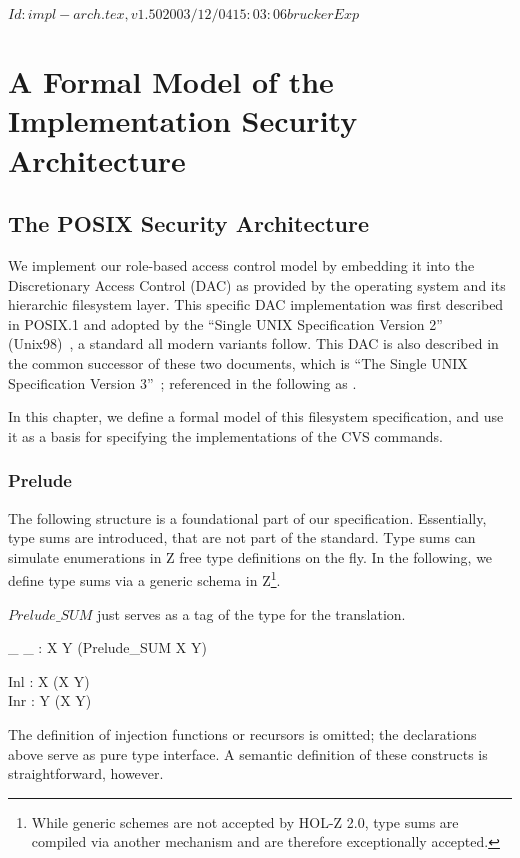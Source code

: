 
\rcsInfo $Id: impl-arch.tex,v 1.50 2003/12/04 15:03:06 brucker Exp $

\chapter{A Formal Model of the Implementation Security Architecture}\label{cha:form-model-impl} 

\section{The POSIX Security Architecture}\label{sec:posix-secur-arch}

We implement our role-based access control model by embedding it into the
Discretionary Access Control (DAC) as provided by the \unix{} operating system
and its hierarchic filesystem layer. This specific DAC implementation was first
described in POSIX.1 and adopted by the ``Single UNIX Specification Version
2'' (Unix98)~\cite{open:unix:1997}, a
standard all modern \unix variants follow. This DAC is also described in the
common successor of these two documents, which is ``The Single UNIX
Specification Version 3''~\cite{open:unix:2002}; referenced in the following as
\susv.

In this chapter, we define a formal model of this filesystem specification, and
use it as a basis for specifying the implementations of the CVS commands.  

\subsection{Prelude}

\vspace{1ex}\noindent

The following structure is a foundational part of our specification.
Essentially, type sums are introduced, that are not part of the standard. Type
sums can simulate enumerations in Z free type definitions on the fly. In the
following, we define type sums via a generic schema in Z\footnote{While generic
  schemes are not accepted by HOL-Z 2.0, type sums are compiled via another
  mechanism and are therefore exceptionally accepted.}.

$Prelude\_SUM$ just serves as a tag of the type for the translation.
\begin{zed}
\end{zed}
\begin{gendef}[X,Y]
  \_ \pplus \_ : X \cross Y \fun \power (Prelude\_SUM \cross X \cross Y) 
\end{gendef}
\begin{gendef}[X,Y]
  Inl   : X \fun (X \pplus Y) \\
  Inr   : Y \fun (X \pplus Y) \\ 
\end{gendef}
The definition of injection functions or recursors is omitted; the declarations
above serve as pure type interface. A semantic definition of these constructs is
straightforward, however.


